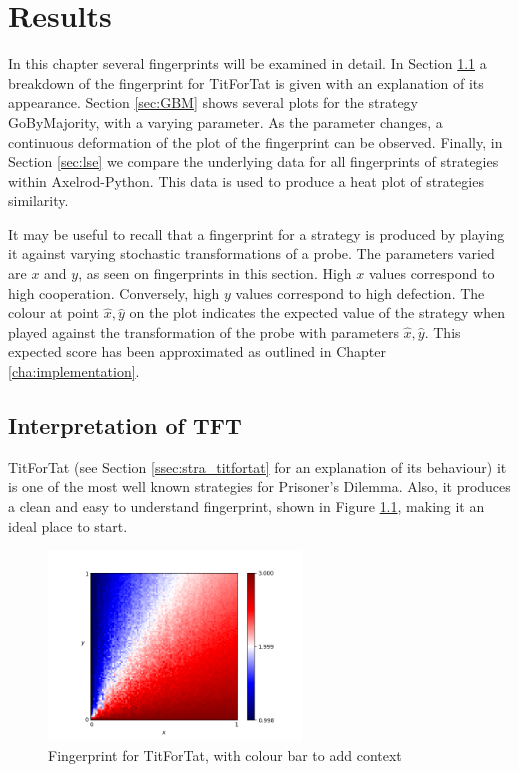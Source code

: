 
\chapter{Results}\label{cha:results}

In this chapter several fingerprints will be examined in detail.
In Section \ref{sec:tft} a breakdown of the fingerprint for TitForTat is given with an explanation of its appearance.
Section \ref{sec:GBM} shows several plots for the strategy GoByMajority, with a varying parameter.
As the parameter changes, a continuous deformation of the plot of the
fingerprint can be observed.
Finally, in Section \ref{sec:lse} we compare the underlying data for all fingerprints of strategies within Axelrod-Python.
This data is used to produce a heat plot of strategies similarity.

It may be useful to recall that a fingerprint for a strategy is produced by playing it against varying stochastic transformations of a probe.
The parameters varied are $x$ and $y$, as seen on fingerprints in this section.
High $x$ values correspond to high cooperation.
Conversely, high $y$ values correspond to high defection.
The colour at point $\hat{x}, \hat{y}$ on the plot indicates the expected value of the strategy when played against the transformation of the probe with parameters $\hat{x}, \hat{y}$.
This expected score has been approximated as outlined in Chapter \ref{cha:implementation}.


\section{Interpretation of TFT}\label{sec:tft}
TitForTat (see Section \ref{ssec:stra_titfortat} for an explanation of its behaviour) it is one of the most well known strategies for Prisoner's Dilemma.
Also, it produces a clean and easy to understand fingerprint, shown in Figure \ref{fig:TFT}, making it an ideal place to start.

\begin{figure}[hbtp!]
\centering
\includegraphics[width = 0.6\textwidth]{../img/Numerical/Tit_For_Tat.png}
\caption{Fingerprint for TitForTat, with colour bar to add context}
\label{fig:TFT}
\end{figure}

